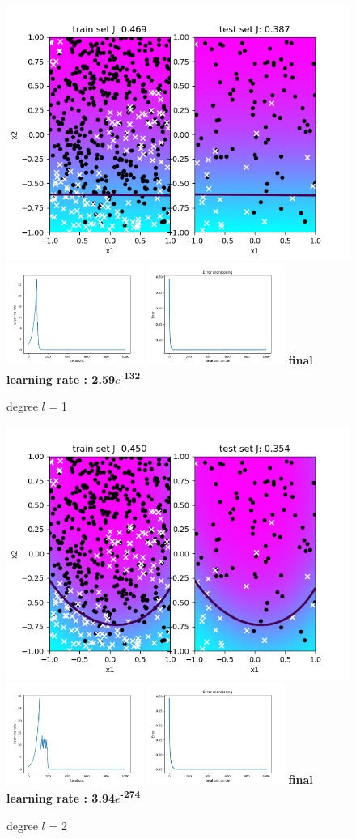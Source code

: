 \documentclass[a4paper]{article}
\begin{document}
\begin{figure}[h]
	\includegraphics[width=0.4	\textwidth]{logreg_deg1_iter20000.png}
	\includegraphics[width=0.4\textwidth]{logreg_deg1_iter20000_learn.png}
	\includegraphics[width=0.4\textwidth]{logreg_deg1_iter20000_error.png}
	\textbf{final learning rate : 2.59$e$\textsuperscript{-132}}
	\caption{degree $l$ = 1}
\end{figure}
	\begin{figure}[h]
	\includegraphics[width=0.4	\textwidth]{logreg_deg2_iter2000.png}
	\includegraphics[width=0.4\textwidth]{logreg_deg2_iter2000_learn.png}
	\includegraphics[width=0.4\textwidth]{logreg_deg2_iter2000_error.png}
	\textbf{final learning rate : 3.94$e$\textsuperscript{-274}}
	\caption{degree $l$ = 2}
\end{figure}
\end{document}
